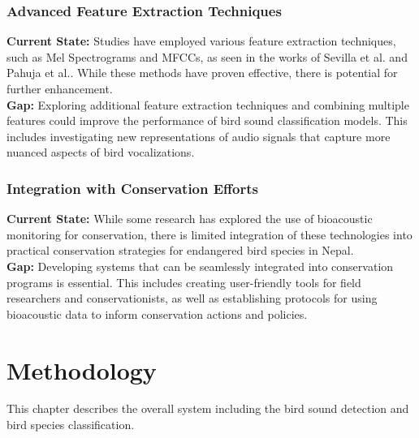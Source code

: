 \subsection{Advanced Feature Extraction Techniques}
\textbf{Current State:} Studies have employed various feature extraction techniques, such as Mel Spectrograms and MFCCs, as seen in the works of Sevilla et al.\cite{sevilla2017audio} and Pahuja et al.\cite{pahuja2021sound}. While these methods have proven effective, there is potential for further enhancement.\\
\textbf{Gap:} Exploring additional feature extraction techniques and combining multiple features could improve the performance of bird sound classification models. This includes investigating new representations of audio signals that capture more nuanced aspects of bird vocalizations.

\subsection{Integration with Conservation Efforts}
\textbf{Current State:} While some research has explored the use of bioacoustic monitoring for conservation, there is limited integration of these technologies into practical conservation strategies for endangered bird species in Nepal.\\
\textbf{Gap:} Developing systems that can be seamlessly integrated into conservation programs is essential. This includes creating user-friendly tools for field researchers and conservationists, as well as establishing protocols for using bioacoustic data to inform conservation actions and policies.
\newpage

\chapter{Methodology}
This chapter describes the overall system including the bird sound detection
and bird species classification.

